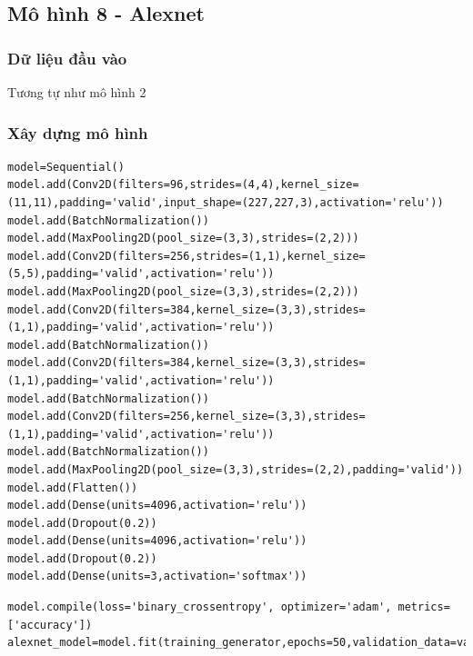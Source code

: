 


\newpage


\subsection{Mô hình 8 - Alexnet} 
\subsubsection{Dữ liệu đầu vào}
Tương tự như mô hình 2
\subsubsection{Xây dựng mô hình}
\begin{lstlisting}
model=Sequential()
model.add(Conv2D(filters=96,strides=(4,4),kernel_size=(11,11),padding='valid',input_shape=(227,227,3),activation='relu'))
model.add(BatchNormalization())
model.add(MaxPooling2D(pool_size=(3,3),strides=(2,2)))
model.add(Conv2D(filters=256,strides=(1,1),kernel_size=(5,5),padding='valid',activation='relu'))
model.add(MaxPooling2D(pool_size=(3,3),strides=(2,2)))
model.add(Conv2D(filters=384,kernel_size=(3,3),strides=(1,1),padding='valid',activation='relu'))
model.add(BatchNormalization())
model.add(Conv2D(filters=384,kernel_size=(3,3),strides=(1,1),padding='valid',activation='relu'))
model.add(BatchNormalization())
model.add(Conv2D(filters=256,kernel_size=(3,3),strides=(1,1),padding='valid',activation='relu'))
model.add(BatchNormalization())
model.add(MaxPooling2D(pool_size=(3,3),strides=(2,2),padding='valid'))
model.add(Flatten())
model.add(Dense(units=4096,activation='relu'))
model.add(Dropout(0.2))
model.add(Dense(units=4096,activation='relu'))
model.add(Dropout(0.2))
model.add(Dense(units=3,activation='softmax')) 
\end{lstlisting}

\begin{lstlisting}
model.compile(loss='binary_crossentropy', optimizer='adam', metrics=['accuracy']) 
alexnet_model=model.fit(training_generator,epochs=50,validation_data=validation_generator,steps_per_epoch=len(training_generator),validation_steps=len(validation_generator))
\end{lstlisting}

